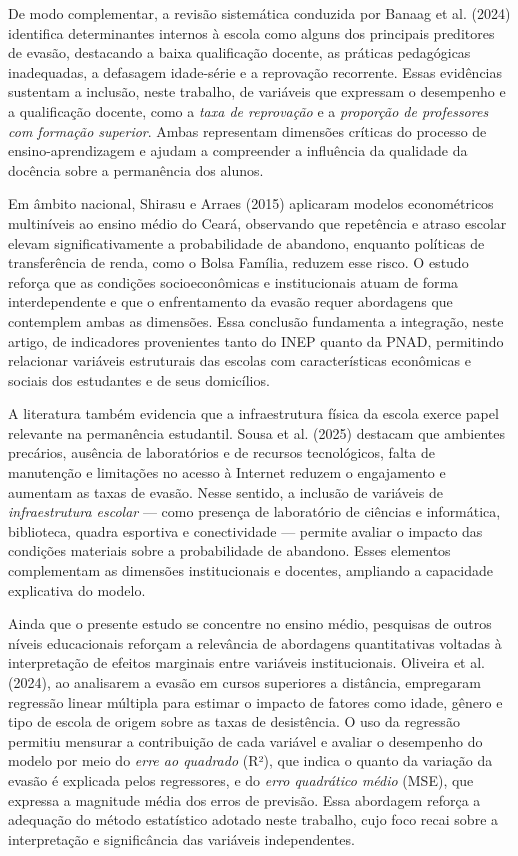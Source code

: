 \documentclass[english, spanish, brazilian]{RBIEarticle} %
\begin{document}
De modo complementar, a revisão sistemática conduzida por Banaag et al. (2024) identifica determinantes internos à escola como alguns dos principais preditores de evasão, destacando a baixa qualificação docente, as práticas pedagógicas inadequadas, a defasagem idade-série e a reprovação recorrente. Essas evidências sustentam a inclusão, neste trabalho, de variáveis que expressam o desempenho e a qualificação docente, como a \textit{taxa de reprovação} e a \textit{proporção de professores com formação superior}. Ambas representam dimensões críticas do processo de ensino-aprendizagem e ajudam a compreender a influência da qualidade da docência sobre a permanência dos alunos.

Em âmbito nacional, Shirasu e Arraes (2015) aplicaram modelos econométricos multiníveis ao ensino médio do Ceará, observando que repetência e atraso escolar elevam significativamente a probabilidade de abandono, enquanto políticas de transferência de renda, como o Bolsa Família, reduzem esse risco. O estudo reforça que as condições socioeconômicas e institucionais atuam de forma interdependente e que o enfrentamento da evasão requer abordagens que contemplem ambas as dimensões. Essa conclusão fundamenta a integração, neste artigo, de indicadores provenientes tanto do INEP quanto da PNAD, permitindo relacionar variáveis estruturais das escolas com características econômicas e sociais dos estudantes e de seus domicílios.

A literatura também evidencia que a infraestrutura física da escola exerce papel relevante na permanência estudantil. Sousa et al. (2025) destacam que ambientes precários, ausência de laboratórios e de recursos tecnológicos, falta de manutenção e limitações no acesso à Internet reduzem o engajamento e aumentam as taxas de evasão. Nesse sentido, a inclusão de variáveis de \textit{infraestrutura escolar} — como presença de laboratório de ciências e informática, biblioteca, quadra esportiva e conectividade — permite avaliar o impacto das condições materiais sobre a probabilidade de abandono. Esses elementos complementam as dimensões institucionais e docentes, ampliando a capacidade explicativa do modelo.

Ainda que o presente estudo se concentre no ensino médio, pesquisas de outros níveis educacionais reforçam a relevância de abordagens quantitativas voltadas à interpretação de efeitos marginais entre variáveis institucionais. Oliveira et al. (2024), ao analisarem a evasão em cursos superiores a distância, empregaram regressão linear múltipla para estimar o impacto de fatores como idade, gênero e tipo de escola de origem sobre as taxas de desistência. O uso da regressão permitiu mensurar a contribuição de cada variável e avaliar o desempenho do modelo por meio do \textit{erre ao quadrado} (R²), que indica o quanto da variação da evasão é explicada pelos regressores, e do \textit{erro quadrático médio} (MSE), que expressa a magnitude média dos erros de previsão. Essa abordagem reforça a adequação do método estatístico adotado neste trabalho, cujo foco recai sobre a interpretação e significância das variáveis independentes.
\end{document}

